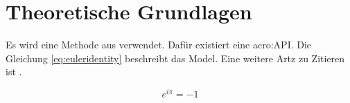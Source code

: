 
\chapter{Theoretische Grundlagen} %
\label{cha:theoretische_grundlagen}

Es wird eine Methode aus \cite{knuth1997art} verwendet. Dafür existiert eine \gls{acro:API}. Die Gleichung \ref{eq:euleridentity} beschreibt das Model. Eine weitere Artz zu Zitieren ist \textcite{weise2014benchmarking}.

\begin{equation}\label{eq:euleridentity}
    e^{i\pi} = -1
\end{equation}

